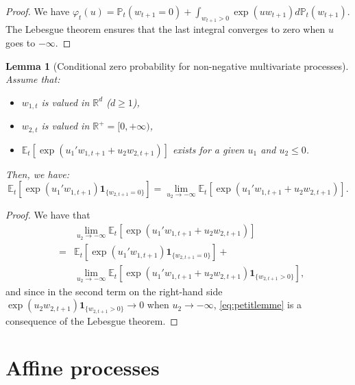\documentclass[
  12pt,
]{book}
\providecommand{\tightlist}{%
  \setlength{\itemsep}{0pt}\setlength{\parskip}{0pt}}
\newtheorem{lemma}{Lemma}[chapter]
\theoremstyle{definition}
\theoremstyle{definition}
\theoremstyle{definition}
\theoremstyle{definition}
\theoremstyle{remark}
\begin{document}
\begin{proof}
We have \(\varphi_t(u) = \mathbb{P}_t(w_{t+1} = 0) + \int_{w_{t+1}> 0} \exp(u w_{t+1}) d\mathbb{P}_t(w_{t+1})\). The Lebesgue theorem ensures that the last integral converges to zero when \(u\) goes to \(-\infty\).
\end{proof}

\begin{lemma}[Conditional zero probability for non-negative multivariate processes]
\protect\hypertarget{lem:lemPetitLemme}{}\label{lem:lemPetitLemme}Assume that:

\begin{itemize}
\tightlist
\item
  \(w_{1,t}\) is valued in \(\mathbb{R}^{d}\) (\(d \geq 1\)),
\item
  \(w_{2,t}\) is valued in \(\mathbb{R}^+ = [0, + \infty )\),
\item
  \(\mathbb{E}_t \left[ \exp \left( u_1 ' w_{1,t+1} + u_2 w_{2,t+1} \right) \right]\) exists for a given \(u_1\) and \(u_2 \leq 0\).
\end{itemize}

Then, we have:
\begin{equation}
\mathbb{E}_t \left[ \exp( u_1 ' w_{1,t+1})  \textbf{1}_{\{w_{2,t+1} = 0 \}} \right] =  \underset{u_2 \rightarrow -\infty}{\lim} \mathbb{E}_t \left[ \exp( u_1 ' w_{1,t+1} + u_2   w_{2,t+1} )  \right].\label{eq:petitlemme}
\end{equation}
\end{lemma}

\begin{proof}
We have that
\begin{eqnarray*}
&&\underset{u_2 \rightarrow -\infty}{\lim} \mathbb{E}_t \left[ \exp( u_1 ' w_{1,t+1} + u_2   w_{2,t+1} )  \right] \\
&=& \mathbb{E}_t \left[ \exp( u_1 ' w_{1,t+1})   \textbf{1}_{\{w_{2,t+1} = 0 \}} \right] +\\
&& \underset{u_2 \rightarrow -\infty}{\lim}   \mathbb{E}_t \left[ \exp( u_1 ' w_{1,t+1} + u_2   w_{2,t+1} )  \textbf{1}_{\{w_{2,t+1} > 0 \}}  \right] ,
\end{eqnarray*}
and since in the second term on the right-hand side \(\exp(u_2 w_{2,t+1}) \textbf{1}_{\{w_{2,t+1} > 0 \}} \rightarrow 0\) when \(u_2 \rightarrow -\infty\), \eqref{eq:petitlemme} is a consequence of the Lebesgue theorem.
\end{proof}

\hypertarget{AffineCar}{%
\section{Affine processes}\label{AffineCar}}
\end{document}
